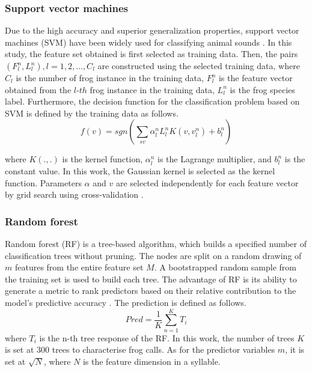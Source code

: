 \subsubsection{Support vector machines}
Due to the high accuracy and superior generalization properties, support vector machines (SVM) have been widely used for classifying animal sounds \citep{huang2009frog} \citep{acevedo2009automated}. In this study, the feature set obtained is first selected as training data. Then, the pairs $(F_{l}^{n},L_{l}^{n}), l=1,2,..., C_{l}$ are constructed using the selected training data, where $C_{l}$ is the number of frog instance in the training data, $F_{l}^{n}$ is the feature vector obtained from the $l$-$th$ frog instance in the training data, $L_{l}^{n}$ is the frog species label. Furthermore, the decision function for the classification problem based on SVM \citep{cortes1995support} is defined by the training data as follows.
\begin{equation}
f(v) = sgn(\sum_{sv}\alpha_{l}^{n}L_{l}^{n}K(v,v_{l}^{n})+b_{l}^{n})
\end{equation}

where $K(.,.)$ is the kernel function, $\alpha_{l}^{n}$ is the Lagrange multiplier, and $b_{l}^{n}$ is the constant value. In this work, the Gaussian kernel is selected as the kernel function. Parameters $\alpha$ and $v$ are selected independently for each feature vector by grid search using cross-validation \citep{hsu2003practical}.


\subsubsection{Random forest}
Random forest (RF) is a tree-based algorithm, which builds a specified number of classification trees without pruning. The nodes are split on a random drawing of $m$ features
from the entire feature set $M$. A bootstrapped random sample from the training set is used to build each tree. The advantage of RF is its ability to generate a metric to rank predictors based on their relative contribution to the model's predictive accuracy \citep{bao2005prediction}. The prediction is defined as follows.
\begin{equation}
Pred = \frac{1}{K}\sum_{n=1}^{K}T_{i}
\end{equation}
where $T_{i}$ is the n-th tree response of the RF. In this work, the number of trees $K$ is set at 300 trees to characterise frog calls. As for the predictor variables $m$, it is set at $\sqrt{N}$, where $N$ is the feature dimension in a syllable. 

